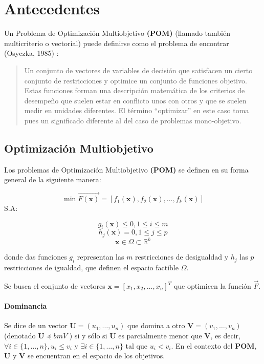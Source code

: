 \chapter{Antecedentes}


Un Problema de Optimización Multiobjetivo \textbf{(POM)} (llamado también
multicriterio o vectorial) puede definirse como el problema de
encontrar (Osyczka, 1985) \cite{Osyczka1985193}:
\begin{quote}
Un conjunto de vectores de variables de decisión que satisfacen un cierto
conjunto de restricciones y optimice un conjunto de funciones
objetivo. Estas funciones forman una descripción matemática
de los criterios de desempeño que suelen estar en conflicto
unos con otros y que se suelen medir en unidades diferentes.
El término ``optimizar'' en este caso toma pues un significado
diferente al del caso de problemas mono-objetivo.
\end{quote}

\section{Optimización Multiobjetivo}

Los problemas de Optimización Multiobjetivo \textbf{(POM)} se definen en su forma general de la siguiente manera:
 
$$\min \overrightarrow{F(\bm{x})} = \left[ f_1(\bm{x}), f_2(\bm{x}) , \dots, f_k(\bm{x}) \right] $$
S.A:
 
$$g_i(\bm{x}) \leq 0, 1 \leq i \leq m$$
$$h_j(\bm{x}) = 0, 1 \leq j \leq p$$
$$\bm{x} \in \Omega \subset \mathbb{R}^k$$

donde das funciones $g_i$ representan las $m$ restricciones de desigualdad y $h_j$ las $p$ restricciones de igualdad, que definen el espacio factible $\Omega$.

Se busca el conjunto de vectores $\bm{x}=[x_1,x_2,\dots,x_n]^T$ que optimicen la función $\overrightarrow{F}$. 

\subsubsection{Dominancia}

Se dice de un vector $\bm{U}= (u_1 ,\dots, u_n )$ que domina a otro $\bm{V}= (v_1 ,\dots, v_n )$ (denotado $\bm{U} \preceq bm{V}$ ) si y sólo si $\bm{U}$ es parcialmente menor que $\bm{V}$, es decir,
$\forall i \in \{1,\dots, n\}, u_i \leq v_i$ y $\exists i \in \{1,\dots, n \} $ tal que  $u_i<v_i$.
\newline
En el contexto del \textbf{POM},  $\bm{U}$ y $\bm{V}$ se encuentran en el espacio de los objetivos.
 
